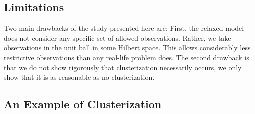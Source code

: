\subsection{Limitations}\label{subsec:limitations}
Two main drawbacks of the study presented here are: First, the relaxed
model does not consider any specific set of allowed
observations. Rather, we take observations in the unit ball in some
Hilbert space. This allows considerably less restrictive observations
than any real-life problem does. The second drawback is that we do not
show rigorously that clusterization necessarily occurs, we only show
that it is as reasonable as no clusterization.


\subsection{An Example of Clusterization}\label{subsec:example}
